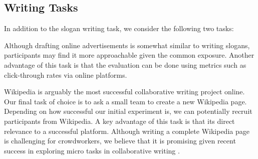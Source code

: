 \subsection{Writing Tasks}
\label{sec:tasks}

In addition to the slogan writing task, we consider the following two tasks:

Although drafting online advertisements is somewhat similar to writing slogans,
participants may find it more approachable given the common exposure.
Another advantage of this task is that the evaluation can be done using metrics such as click-through rates via online platforms.

 Wikipedia is arguably the most successful collaborative writing project online.
Our final task of choice is to ask a small team to create a new Wikipedia page.
Depending on how successful our initial experiment is, we can potentially recruit participants from Wikipedia.
A key advantage of this task is that its direct relevance to a successful platform.
Although writing a complete Wikipedia page is challenging for crowdworkers,
we believe that it is promising given recent success in exploring micro tasks in collaborative writing \citep{teevan2016supporting,salehi2017communicating}.




